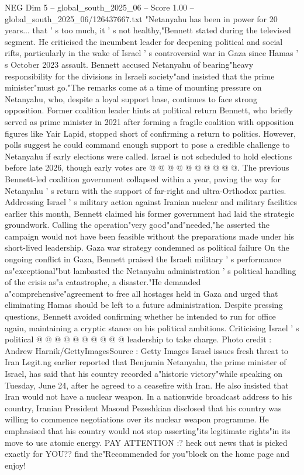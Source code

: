 \begin{textsample}{NEG Dim 5 – global\_south\_2025\_06 – Score 1.00 – global\_south\_2025\_06/126437667.txt}  \label{ex:f5_neg_395}
"Netanyahu has been in power for 20 years... that ' s too much, it ' s not healthy,"Bennett stated during the televised segment.
He criticised the incumbent leader for deepening political and social rifts, particularly in the wake of Israel ' s controversial war in Gaza since Hamas ' s October 2023 assault.
Bennett accused Netanyahu of bearing"heavy responsibility for the divisions in Israeli society"and insisted that the prime minister"must go."The remarks come at a time of mounting pressure on Netanyahu, who, despite a loyal support base, continues to face strong opposition.
Former coalition leader hints at political return Bennett, who briefly served as prime minister in 2021 after forming a fragile coalition with opposition figures like Yair Lapid, stopped short of confirming a return to politics.
However, polls suggest he could command enough support to pose a credible challenge to Netanyahu if early elections were called.
Israel is not scheduled to hold elections before late 2026, though early votes are @ @ @ @ @ @ @ @ @ @.
The previous Bennett-led coalition government collapsed within a year, paving the way for Netanyahu ' s return with the support of far-right and ultra-Orthodox parties.
Addressing Israel ' s military action against Iranian nuclear and military facilities earlier this month, Bennett claimed his former government had laid the strategic groundwork.
Calling the operation"very good"and"needed,"he asserted the campaign would not have been feasible without the preparations made under his short-lived leadership.
Gaza war strategy condemned as political failure On the ongoing conflict in Gaza, Bennett praised the Israeli military ' s performance as"exceptional"but lambasted the Netanyahu administration ' s political handling of the crisis as"a catastrophe, a disaster."He demanded a"comprehensive"agreement to free all hostages held in Gaza and urged that eliminating Hamas should be left to a future administration.
Despite pressing questions, Bennett avoided confirming whether he intended to run for office again, maintaining a cryptic stance on his political ambitions.
Criticising Israel ' s political @ @ @ @ @ @ @ @ @ @ leadership to take charge.
Photo credit : Andrew Harnik/GettyImagesSource : Getty Images Israel issues fresh threat to Iran Legit.ng earlier reported that Benjamin Netanyahu, the prime minister of Israel, has said that his country recorded a"historic victory"while speaking on Tuesday, June 24, after he agreed to a ceasefire with Iran.
He also insisted that Iran would not have a nuclear weapon.
In a nationwide broadcast address to his country, Iranian President Masoud Pezeshkian disclosed that his country was willing to commence negotiations over its nuclear weapon programme.
He emphasised that his country would not stop asserting"its legitimate rights"in its move to use atomic energy.
PAY ATTENTION :? heck out news that is picked exactly for YOU?? find the"Recommended for you"block on the home page and enjoy!

\end{textsample}
